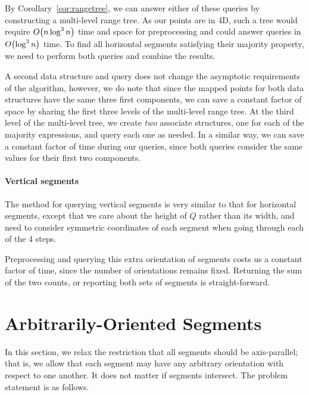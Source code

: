 By Corollary~\ref{cor:rangetree}, we can answer either of these queries by constructing a multi-level range tree.  As our points are in 4D, such a tree would require $O\!\left(n \log^3{n}\right)$ time and space for preprocessing and could answer queries in $O\!\left(\log^3{n}\right)$ time.  To find all horizontal segments satisfying their majority property, we need to perform both queries and combine the results.  

A second data structure and query does not change the asymptotic requirements of the algorithm, however, we do note that since the mapped points for both data structures have the same three first components, we can save a constant factor of space by sharing the first three levels of the multi-level range tree. At the third level of the multi-level tree, we create \emph{two} associate structures, one for each of the majority expressions, and query each one as needed. In a similar way, we can save a constant factor of time during our queries, since both queries consider the same values for their first two components.


\paragraph{Vertical segments}

The method for querying vertical segments is very similar to that for horizontal segments, except that we care about the height of $Q$ rather than its width, and need to consider symmetric coordinates of each segment when going through each of the 4 steps.

Preprocessing and querying this extra orientation of segments costs us a constant factor of time, since the number of orientations remains fixed.  Returning the sum of the two counts, or reporting both sets of segments is straight-forward.



\section{Arbitrarily-Oriented Segments}
\label{:rectangles:ao}

In this section, we relax the restriction that all segments should be axis-parallel; that is, we allow that each segment may have any arbitrary orientation with respect to one another.  It does not matter if segments intersect. The problem statement is as follows.

